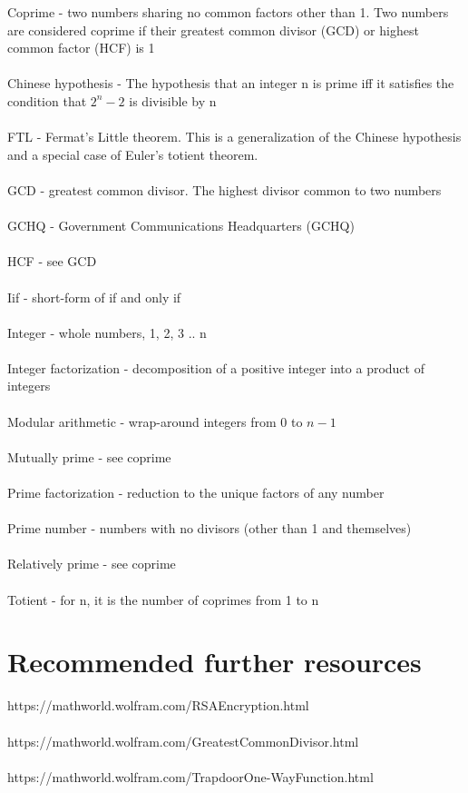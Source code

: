 \documentclass[11pt]{article}   	%
\begin{document}
Coprime - two numbers sharing no common factors other than 1. Two numbers are considered coprime if their greatest common divisor (GCD) or highest common factor (HCF) is 1 \\
\\
Chinese hypothesis - The hypothesis that an integer n is prime iff it satisfies the condition that $ 2^n - 2 $ is divisible by n \\
\\
FTL - Fermat's Little theorem. This is a generalization of the Chinese hypothesis and a special case of Euler's totient theorem. \\
\\
GCD - greatest common divisor. The highest divisor common to two numbers \\
\\
GCHQ - Government Communications Headquarters (GCHQ) \\
\\
HCF - see GCD \\
\\
Iif - short-form of if and only if \\
\\
Integer - whole numbers, 1, 2, 3 .. n \\
\\
Integer factorization - decomposition of a positive integer into a product of integers \\
\\
Modular arithmetic - wrap-around integers from 0 to $ n - 1 $ \\
\\
Mutually prime - see coprime \\
\\
Prime factorization - reduction to the unique factors of any number \\
\\
Prime number - numbers with no divisors (other than 1 and themselves) \\
\\
Relatively prime - see coprime \\
\\
Totient - for n, it is the number of coprimes from 1 to n \\

\break


\section*{Recommended further resources}

https://mathworld.wolfram.com/RSAEncryption.html \\
\\
https://mathworld.wolfram.com/GreatestCommonDivisor.html \\
\\
https://mathworld.wolfram.com/TrapdoorOne-WayFunction.html
\end{document}
